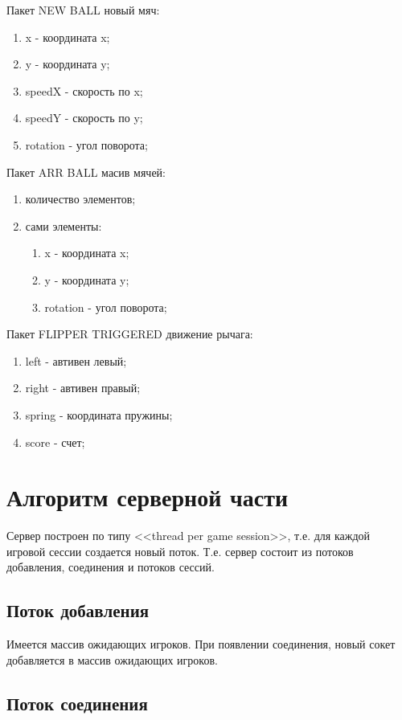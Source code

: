 Пакет NEW BALL новый мяч:
\begin{enumerate}
\item x - координата x;
\item y - координата y;
\item speedX - скорость по x;
\item speedY - скорость по y;
\item rotation - угол поворота;
\end{enumerate}

Пакет ARR BALL масив мячей:
\begin{enumerate}
\item количество элементов;
\item сами элементы:
  \begin{enumerate}
  \item x - координата x;
  \item y - координата y;
  \item rotation - угол поворота;
  \end{enumerate}
\end{enumerate}

Пакет FLIPPER TRIGGERED  движение рычага:
\begin{enumerate}
\item left - автивен левый;
\item right - автивен правый;
\item spring - координата пружины;
\item score - счет;
\end{enumerate}

\section{Алгоритм серверной части}

Сервер построен по типу <<thread per game session>>, т.е. для каждой игровой сессии создается новый поток. Т.е. сервер состоит из потоков добавления, соединения и потоков сессий. 

\subsection{Поток добавления}

Имеется массив ожидающих игроков. При появлении соединения, новый сокет добавляется в массив ожидающих игроков.

\subsection{Поток соединения}

